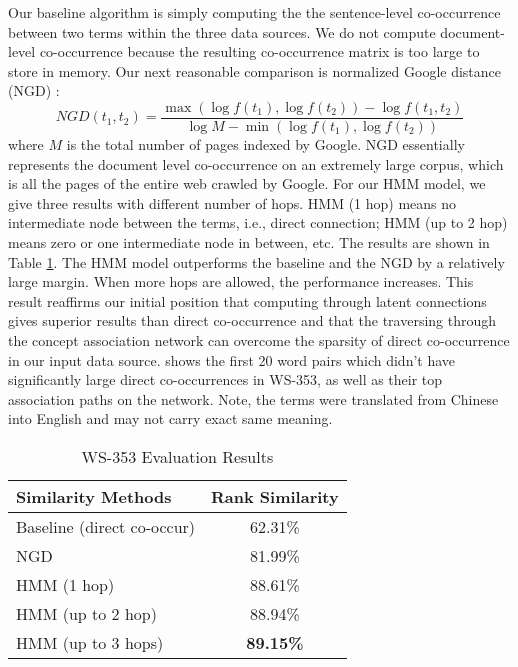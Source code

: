 Our baseline algorithm is simply computing the the sentence-level
co-occurrence between two terms within the three data sources. We do
not compute document-level co-occurrence because the resulting co-occurrence
matrix is too large to store in memory.
Our next reasonable comparison is normalized Google distance (NGD) 
\cite{Cilibrasi:Google}:
\begin{equation}
\label{eq:ngd}
NGD(t_1, t_2) = 
\frac{\max(\log f(t_1), \log f(t_2)) - \log f(t_1, t_2)}
{\log M - \min(\log f(t_1), \log f(t_2))}
\end{equation}
where $M$ is the total number of pages indexed by Google. 
NGD essentially represents the document level co-occurrence on an extremely
large corpus, which is all the pages of the entire web crawled by Google.
For our HMM model, we give three results with different number of hops.
HMM (1 hop) means no intermediate node between the terms, i.e., 
direct connection; HMM (up to 2 hop) means zero or one intermediate node 
in between, etc.
The results are shown in Table \ref{Similarity353}. 
The HMM model outperforms the baseline and the NGD by a relatively large
margin. When more hops are allowed, the performance increases. This result
reaffirms our initial position that computing through latent connections
gives superior results than direct co-occurrence and that the traversing
through the concept association network can overcome the sparsity of 
direct co-occurrence in our input data source. 
 shows the first 20 word pairs which didn't have significantly
large direct co-occurrences in WS-353, as well as their top association paths
on the network. Note, the terms were translated from Chinese into English and
may not carry exact same meaning.
\begin{table}[th]
\centering
\caption{\label{Similarity353}WS-353 Evaluation Results}
\small
\begin{tabular}{|l|c|}
\hline
Similarity Methods & Rank Similarity \\
\hline\hline
Baseline (direct co-occur)& 62.31\%\\ \hline
NGD & 81.99\%\\
\hline
HMM (1 hop) & 88.61\%\\
\hline
HMM (up to 2 hop) & 88.94\%\\
\hline
HMM (up to 3 hops) & {\bf 89.15\%}\\
\hline
\end{tabular}
\end{table}

